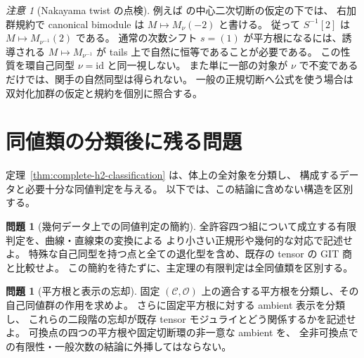 \documentclass[a4paper,11pt]{ltjsarticle}
\numberwithin{equation}{section}
\theoremstyle{plain}
\theoremstyle{definition}
\newtheorem{problem}[theorem]{問題}
\theoremstyle{remark}
\newtheorem{remark}[theorem]{注意}
\newcommand{\OO}{\mathcal O}
\newcommand{\cC}{\mathcal C}
\begin{document}
\begin{remark}[Nakayama twist の点検]
\label{rem:nakayama}
例えば \cite[Section 5]{MU2021} の中心二次切断の仮定の下では、
右加群規約で canonical bimodule は $M\mapsto M_\nu(-2)$ と書ける。
従って $S^{-1}[2]$ は $M\mapsto M_{\nu^{-1}}(2)$ である。
通常の次数シフト $s=(1)$ が平方根になるには、誘導される
$M\mapsto M_{\nu^{-1}}$ が tails 上で自然に恒等であることが必要である。
この性質を環自己同型 $\nu=\mathrm{id}$ と同一視しない。
また単に一部の対象が $\nu$ で不変であるだけでは、関手の自然同型は得られない。
一般の正規切断へ公式を使う場合は双対化加群の仮定と規約を個別に照合する。
\end{remark}






















\section{同値類の分類後に残る問題}
\label{sec:open-problems}

定理~\ref{thm:complete-h2-classification} は、体上の全対象を分類し、
構成するデータと必要十分な同値判定を与える。
以下では、この結論に含めない構造を区別する。

\begin{problem}[幾何データ上での同値判定の簡約]
全許容四つ組について成立する有限判定を、曲線・直線束の変換による
より小さい正規形や幾何的な対応で記述せよ。
特殊な自己同型を持つ点と全ての退化型を含め、既存の tensor の GIT 商と比較せよ。
この簡約を待たずに、主定理の有限判定は全同値類を区別する。
\end{problem}

\begin{problem}[平方根と表示の忘却]
固定 $(\cC,\OO)$ 上の適合する平方根を分類し、その自己同値群の作用を求めよ。
さらに固定平方根に対する ambient 表示を分類し、
これらの二段階の忘却が既存 tensor モジュライとどう関係するかを記述せよ。
可換点の四つの平方根や固定切断環の非一意な ambient を、
全非可換点での有限性・一般次数の結論に外挿してはならない。
\end{problem}
\end{document}
